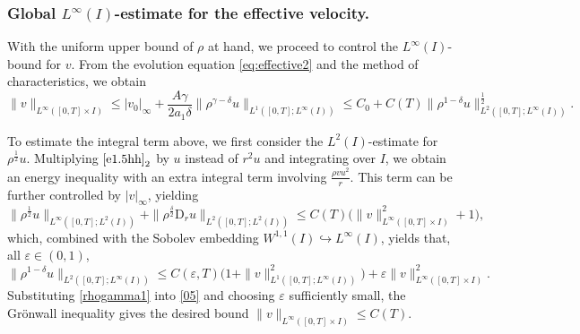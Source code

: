 \documentclass[11pt,reqno]{amsart}
\numberwithin{rk}{section}
\numberwithin{prop}{section}
\numberwithin{mydef}{section}
\numberwithin{lem}{section}
\numberwithin{equation}{section}
\numberwithin{thm}{section}
\begin{document}
\subsubsection{Global $L^\infty(I)$-estimate for the effective velocity.}
With the uniform upper bound of $\rho$ at hand, we proceed to control the $L^\infty(I)$-bound for $v$. From the evolution equation \eqref{eq:effective2} and the method of characteristics, we obtain  
\begin{equation}\label{05}
\|v\|_{L^\infty([0,T]\times I)}\leq |v_0|_{\infty}+\frac{A\gamma}{2a_1\delta}\|\rho^{\gamma-\delta}u\|_{L^1([0,T];L^\infty(I))} \leq C_0+C(T)\|\rho^{1-\delta}u\|_{L^2([0,T];L^\infty(I))}^\frac{1}{2}.
\end{equation}

To estimate the integral term above, we first consider the $L^2(I)$-estimate for $\rho^\frac{1}{2}u$. Multiplying $\eqref{e1.5hh}_2$ by $u$ instead of $r^2u$ and integrating over $I$, we obtain an energy inequality with an extra integral term involving $\frac{\rho v u^2}{r}$. This term can be further controlled by $|v|_{\infty}$, yielding
\begin{equation*} 
\|\rho^{\frac{1}{2}}u\|_{L^\infty([0,T];L^2(I))} +\|\rho^{\frac{\delta}{2}} \mathrm{D}_r u\|_{L^2([0,T];L^2(I))} \leq C(T)\big(\|v\|_{L^\infty([0,T]\times I)}^2+1\big),
\end{equation*}
which, combined with the Sobolev embedding $W^{1,1}(I)\hookrightarrow L^\infty(I)$, yields that, all $\varepsilon\in(0,1)$,
\begin{equation}\label{rhogamma1}
\|\rho^{1-\delta}u\|_{L^2([0,T];L^\infty(I))}\leq C(\varepsilon,T) \big(1+\|v\|_{L^1([0,T];L^\infty(I))}^2\big)+\varepsilon\|v\|_{L^\infty([0,T]\times I)}^2.
\end{equation}
Substituting \eqref{rhogamma1} into \eqref{05} and choosing $\varepsilon$ sufficiently small, the Gr\"onwall inequality gives the desired bound $\|v\|_{L^\infty([0,T]\times I)}\leq C(T)$.
\end{document}
